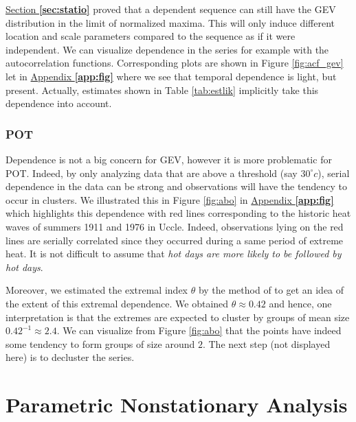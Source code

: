\hyperref[sec:statio]{Section \textbf{\ref{sec:statio}}} proved that a dependent sequence can still have the GEV distribution in the limit of normalized maxima. This will only induce different location and scale
parameters compared to the sequence as if it were independent.
We can visualize dependence in the series for example with the autocorrelation functions. Corresponding plots are shown in Figure \ref{fig:acf_gev} let in \hyperref[app:fig]{Appendix \textbf{\ref{app:fig}}} where we see that temporal dependence is light, but present. 
Actually, estimates shown in Table \ref{tab:estlik} implicitly take this dependence into account. 

\subsubsection*{POT}

 Dependence is not a big concern for GEV, however it is more problematic for POT. Indeed, by only analyzing data that are above a threshold (say $30^{\circ}c$), serial dependence in the data can be strong and observations will have the tendency to occur in clusters. We illustrated this in Figure \ref{fig:abo} in \hyperref[app:fig]{Appendix \textbf{\ref{app:fig}}} which highlights this dependence with red lines corresponding to the historic heat waves of summers 1911 and 1976 in Uccle. Indeed, observations lying on the red lines are serially correlated since they occurred during a same period of extreme heat. It is not difficult to assume that \emph{hot days are more likely to be followed by hot days}.
 
Moreover, we estimated the extremal index $\theta$ by the method of \citet{ferro_inference_2003} to get an idea of the extent of this extremal dependence. We obtained $\hat{\theta}\approx 0.42$ and hence, one interpretation is that the extremes are expected to cluster by groups of mean size $0.42^{-1}\approx 2.4$. We can visualize from Figure \ref{fig:abo} that the points have indeed some tendency to form groups of size around $2$. The next step (not displayed here) is to decluster the series.



\section{Parametric Nonstationary Analysis}\label{sec:xpnp}


